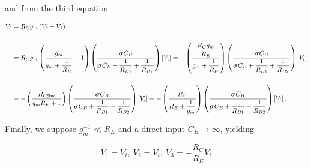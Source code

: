 	\noindent and from the third equation

\begin{align}
	V_3 &= R_Cg_m\left(V_2 - V_1\right) \nonumber\\[5mm]
%
	&= R_Cg_m\left(\dfrac{g_m}{g_m + \dfrac{1}{R_E}} - 1\right) \left( \dfrac{\dpo C_B}{\dpo C_B + \dfrac{1}{R_{B1}} + \dfrac{1}{R_{B2}}}\right)\left[V_i\right] = -\left(\dfrac{\dfrac{R_Cg_m}{R_E}}{g_m + \dfrac{1}{R_E}}\right) \left( \dfrac{\dpo C_B}{\dpo C_B + \dfrac{1}{R_{B1}} + \dfrac{1}{R_{B2}}}\right)\left[V_i\right] \nonumber\\[5mm]
%
	&= -\left(\dfrac{R_Cg_m}{g_mR_E + 1}\right) \left( \dfrac{\dpo C_B}{\dpo C_B + \dfrac{1}{R_{B1}} + \dfrac{1}{R_{B2}}}\right)\left[V_i\right] = -\left(\dfrac{R_C}{R_E + \dfrac{1}{g_m}}\right) \left( \dfrac{\dpo C_B}{\dpo C_B + \dfrac{1}{R_{B1}} + \dfrac{1}{R_{B2}}}\right)\left[V_i\right].
\end{align}

	Finally, we suppose $g_m^{-1} \ll R_E$ and a direct input $C_B\to\infty$, yielding

\begin{equation} V_1 = V_i,\ V_2 = V_i,\ V_3 = -\dfrac{R_C}{R_E} V_i \end{equation}
